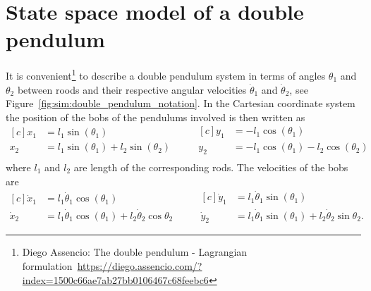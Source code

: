 \section{State space model of a double pendulum}\label{appendix:proofs:double_pendulum_dynamics}


It is convenient\footnote{Diego Assencio: The double pendulum - Lagrangian formulation~\url{https://diego.assencio.com/?index=1500c66ae7ab27bb0106467c68feebc6}} to describe a double pendulum system in terms of angles $\theta_1$ and
  $\theta_2$ between roods and their respective angular velocities $\dot{\theta}_1$ and
  $\dot{\theta}_2$, see Figure~\ref{fig:sim:double_pendulum_notation}.
In the Cartesian coordinate system the position of the bobs of the pendulums involved is then
  written as
  \begin{equation}
    \label{eq:appendix:double_pendulum_bobs}
    \begin{aligned}[c] x_1 &
                 = l_1 \sin(\theta_1) \\ x_2 & = l_1 \sin(\theta_1) + l_2\sin(\theta_2) \\
    \end{aligned}
    \qquad
    \begin{aligned}[c] y_1 & = -l_1 \cos(\theta_1) \\ y_2 & = -l_1\cos(\theta_1) -
                 l_2\cos(\theta_2)               \\
    \end{aligned}
  \end{equation}
  where $l_1$ and $l_2$ are length of the
  corresponding rods.
The velocities of the bobs are \begin{equation}
  \begin{aligned}[c] \dot{x}_1 & = l_1
                 \dot{\theta}_1\cos(\theta_1) \\ \dot{x}_2 & = l_1 \dot{\theta}_1\cos(\theta_1) +
                    l_2\dot{\theta}_2\cos{\theta_2}
  \end{aligned}
  \qquad \begin{aligned}[c] \dot{y}_1 & = l_1
  \dot{\theta}_1\sin(\theta_1) \\ \dot{y}_2 & = l_1 \dot{\theta}_1\sin(\theta_1) +
  l_2\dot{\theta}_2\sin{\theta_2}.
\end{aligned}
\end{equation}

